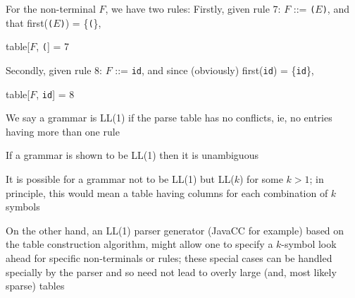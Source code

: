 \documentclass[8pt,a4paper,compress]{beamer}
\newcommand{\mm}[1]{$#1$}
\newenvironment{spaced}
{
\smallskip
\hspace{.5cm}
\begin{minipage}[c]{\textwidth}
}
{
\end{minipage}
\smallskip
}
\begin{document}
\begin{frame}[fragile]
\pause

For the non-terminal $F$, we have two rules: Firstly, given rule 7: $F$  ::= \lstinline{(}$E$\lstinline{)}, and that first(\lstinline{(}$E$\lstinline{)}) = \{\lstinline{(}\},

\text{ }
\begin{spaced}
\begin{production}
table[\mm{F}, \lstinline{(}] = 7
\end{production}
\end{spaced}

\pause

Secondly, given rule 8: $F$  ::= \lstinline{id}, and since (obviously) first(\lstinline{id}) = \{\lstinline{id}\},

\text{ }
\begin{spaced}
\begin{production}
table[\mm{F}, \lstinline{id}] = 8
\end{production}
\end{spaced}

\pause

We say a grammar is LL(1) if the parse table has no conflicts, ie, no entries having more than one rule

\pause
\bigskip

If a grammar is shown to be LL(1) then it is unambiguous

\pause
\bigskip

It is possible for a grammar not to be LL(1) but LL($k$) for some $k > 1$; in principle, this would mean a table having columns for each combination of $k$ symbols

\pause
\bigskip

On the other hand, an LL(1) parser generator (JavaCC for example) based on the table construction algorithm, might allow one to specify a $k$-symbol look ahead for specific non-terminals or rules; these special cases can be handled specially by the parser and so need not lead to overly large (and, most likely sparse) tables
\end{frame}
\end{document}
